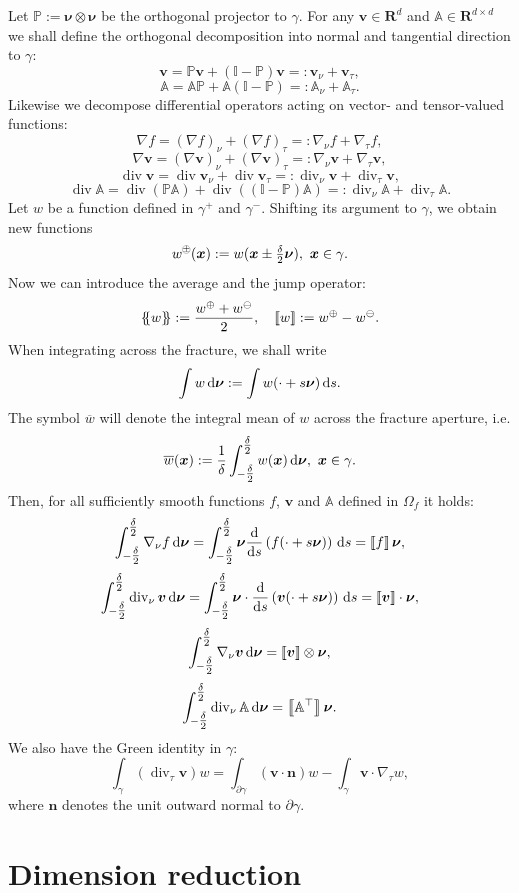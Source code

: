 \documentclass[a4paper]{article}
\def\avg#1{\left\{\mskip-5mu\left\{#1\right\}\mskip-5mu\right\}}
\def\d {\,{\rm d}}
\def\div{\operatorname{div}}
\def\dn{\d\nnu}
\def\jmp#1{\left\llbracket #1 \right\rrbracket}
\def\nn{\vc n}
\def\nnu{\vc\nu}
\def\prtl{\partial}
\def\Real{{\mathbf R}}
\def\tn#1{{\mathbb{#1}}}    %
\def\vc#1{\mathbf{\boldsymbol{#1}}}     %
\def\vv{\vc v}
\def\xx{\vc x}
\newcommand{\eq}[1]{\begin{equation}#1\end{equation}}
\newcommand{\opm}{ %
  {\mathbin{
    \mathchoice
      {\buildcirclepm{\displaystyle     }{0.14ex}{0.95}{0.05ex}{.7}}
      {\buildcirclepm{\textstyle        }{0.14ex}{0.95}{0.05ex}{.7}}
      {\buildcirclepm{\scriptstyle      }{0.13ex}{0.955}{0.04ex}{.55}}
      {\buildcirclepm{\scriptscriptstyle}{0.08ex}{0.95}{0.03ex}{.45}}
  }} 
}
\newcommand\buildcirclepm[5]{%
  \begin{tikzpicture}[baseline=(X.base), inner sep=-#5, outer sep=-.65]
    \node[draw,circle,line width=#4] (X)  {\footnotesize\raisebox{#2}{\scalebox{#3}{$#1\pm$}}};
  \end{tikzpicture}%
}
\begin{document}
Let $\tn P := \nnu\otimes\nnu$ be the orthogonal projector to $\gamma$.
For any $\vv\in\Real^d$ and $\tn A\in\Real^{d\times d}$ we shall define the orthogonal decomposition into normal and tangential direction to $\gamma$:
\eq{ \vv = \tn P\vv + (\tn I-\tn P)\vv =:\vv_\nu + \vv_\tau, }
\eq{ \tn A = \tn A\tn P + \tn A(\tn I-\tn P) =: \tn A_\nu + \tn A_\tau. }
Likewise we decompose differential operators acting on vector- and tensor-valued functions:
\eq{ \label{eq:grad_sc} \nabla f = (\nabla f)_\nu + (\nabla f)_\tau =: \nabla_\nu f + \nabla_\tau f, }
\eq{ \label{eq:grad_vc} \nabla\vv = (\nabla\vv)_\nu + (\nabla\vv)_\tau =: \nabla_\nu\vv + \nabla_\tau\vv, }
\eq{ \div\vv = \div\vv_\nu + \div\vv_\tau =: \div_\nu\vv + \div_\tau\vv, }
\eq{ \label{eq:div_tn} \div\tn A = \div(\tn P\tn A) + \div((\tn I-\tn P)\tn A) =: \div_\nu\tn A + \div_\tau\tn A. }
Let $w$ be a function defined in $\gamma^+$ and $\gamma^-$.
Shifting its argument to $\gamma$, we obtain new functions
\eq{ w^{\opm}(\xx) := w(\xx\pm\tfrac\delta2\nnu), ~\xx\in\gamma. }
Now we can introduce the average and the jump operator:
\eq{ \avg{w} := \frac{w^\oplus+w^\ominus}2,\quad \jmp{w} := w^\oplus-w^\ominus. }
When integrating across the fracture, we shall write
\[ \int w\dn := \int w(\cdot+s\nnu)\d s. \]
The symbol $\overline w$ will denote the integral mean of $w$ across the fracture aperture, i.e.
\eq{\label{eq:def_mean} \overline w(\xx):=\frac1\delta\int_{-\tfrac\delta2}^{\tfrac\delta2} w(\xx) \dn,~\xx\in\gamma. }
Then, for all sufficiently smooth functions $f$, $\vv$ and $\tn A$ defined in $\Omega_f$ it holds:
\eq{ \label{eq:int_grad_nu_sc}
\int_{-\tfrac\delta2}^{\tfrac\delta2}\nabla_\nu f\dn = \int_{-\tfrac\delta2}^{\tfrac\delta2}\nnu\frac{\rm d}{{\rm d}s}\left(f(\cdot+s\nnu)\right)\d s = \jmp{f}\nnu,
}
\eq{ \label{eq:div_nu_vc}
\int_{-\tfrac\delta2}^{\tfrac\delta2}\div_\nu\vv\dn = \int_{-\tfrac\delta2}^{\tfrac\delta2}\nnu\cdot\frac{\rm d}{{\rm d}s}\left(\vv(\cdot+s\nnu)\right)\d s = \jmp{\vv}\cdot\nnu,
}
\eq{ \label{eq:int_grad_nu_vc} \int_{-\tfrac\delta2}^{\tfrac\delta2}\nabla_\nu\vv\dn = \jmp{\vv}\otimes\nnu, }
\eq{ \label{eq:int_div_nu_tn} \int_{-\tfrac\delta2}^{\tfrac\delta2}\div_\nu\tn A \dn = \jmp{\tn A^\top}\nnu. }
We also have the Green identity in $\gamma$:
\eq{ \int_\gamma(\div_\tau\vv)w = \int_{\prtl\gamma}(\vv\cdot\nn)w - \int_\gamma\vv\cdot\nabla_\tau w, }
where $\nn$ denotes the unit outward normal to $\partial\gamma$.



\section{Dimension reduction}
\end{document}
